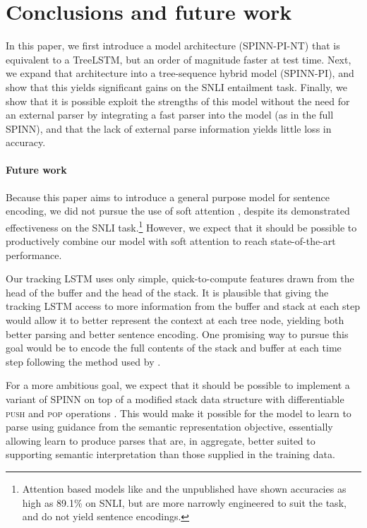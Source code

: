 \documentclass[11pt]{article}
\begin{document}
\section{Conclusions and future work}

In this paper, we first introduce a model architecture (SPINN-PI-NT) that is equivalent to a TreeLSTM, but an order of magnitude faster at test time. Next, we expand that architecture into a tree-sequence hybrid model (SPINN-PI), and show that this yields significant gains on the SNLI entailment task. Finally, we show that it is possible exploit the strengths of this model without the need for an external parser by integrating a fast parser into the model (as in the full SPINN), and that the lack of external parse information yields little loss in accuracy.

\paragraph{Future work} Because this paper aims to introduce a general purpose model for sentence encoding, we did not pursue the use of soft attention \citep{bahdanau2014neural,rocktaschel2015reasoning}, despite its demonstrated effectiveness on the SNLI task.\footnote{Attention based models like \citet{rocktaschel2015reasoning} and the unpublished \citet{cheng2016long} have shown accuracies as high as 89.1\% on SNLI, but are more narrowly engineered to suit the task, and do not yield sentence encodings.} However, we expect that it should be possible to productively combine our model with soft attention to reach state-of-the-art performance.

Our tracking LSTM uses only simple, quick-to-compute features drawn from the head of the buffer and the head of the stack. It is plausible that giving the tracking LSTM access to more information from the buffer and stack at each step would allow it to better represent the context at each tree node, yielding both better parsing and better sentence encoding. One promising way to pursue this goal would be to encode the full contents of the stack and buffer at each time step following the method used by \citet{dyer-EtAl:2015:ACL-IJCNLP}.

For a more ambitious goal, we expect that it should be possible to implement a variant of SPINN on top of a modified stack data structure with differentiable \textsc{push} and \textsc{pop} operations \citep[as in][]{grefenstette2015learning,joulin2015inferring}. This would make it possible for the model to learn to parse using guidance from the semantic representation objective, essentially allowing learn to produce parses that are, in aggregate, better suited to supporting semantic interpretation than those supplied in the training data. 
\end{document}
